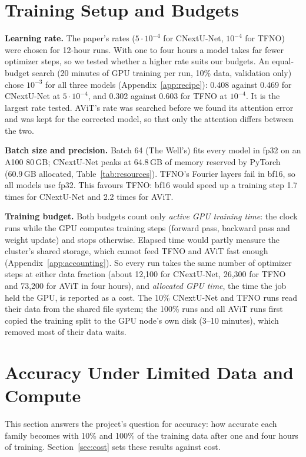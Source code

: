 \documentclass[11pt]{article}
\begin{document}
\section{Training Setup and Budgets}
\label{sec:m2}

\textbf{Learning rate.} The paper's rates ($5\cdot10^{-4}$ for CNextU-Net, $10^{-4}$ for TFNO) were chosen for
12-hour runs. With one to four hours a model takes far fewer optimizer steps, so we tested whether a higher rate
suits our budgets. An equal-budget search (20 minutes of GPU training per run, 10\% data, validation only) chose
$10^{-3}$ for all three models (Appendix~\ref{app:recipe}): 0.408 against 0.469 for CNextU-Net at
$5\cdot10^{-4}$, and 0.302 against 0.603 for TFNO at $10^{-4}$. It is the largest rate tested. AViT's rate was
searched before we found its attention error and was kept for the corrected model, so that only the attention
differs between the two.

\textbf{Batch size and precision.} Batch 64 (The Well's) fits every model in fp32 on an A100 80\,GB; CNextU-Net
peaks at 64.8\,GB of memory reserved by PyTorch (60.9\,GB allocated, Table~\ref{tab:resources}). TFNO's Fourier
layers fail in bf16, so all models use fp32. This favours TFNO: bf16 would speed up a training step 1.7 times for
CNextU-Net and 2.2 times for AViT.

\textbf{Training budget.} Both budgets count only \emph{active GPU training time}: the clock runs while the GPU
computes training steps (forward pass, backward pass and weight update) and stops otherwise. Elapsed time would partly
measure the cluster's shared storage, which cannot feed TFNO and AViT fast enough (Appendix~\ref{app:accounting}).
So every run takes the same number of optimizer steps at either data fraction (about 12,100 for CNextU-Net, 26,300
for TFNO and 73,200 for AViT in four hours), and \emph{allocated GPU time}, the time the job held the GPU, is
reported as a cost. The 10\% CNextU-Net and TFNO runs read their data from the shared file system; the 100\% runs and
all AViT runs first copied the training split to the GPU node's own disk (3--10 minutes), which removed most of their
data waits.

\section{Accuracy Under Limited Data and Compute}
\label{sec:results}

This section answers the project's question for accuracy: how accurate each family becomes with 10\% and 100\% of
the training data after one and four hours of training. Section~\ref{sec:cost} sets these results against cost.
\end{document}
